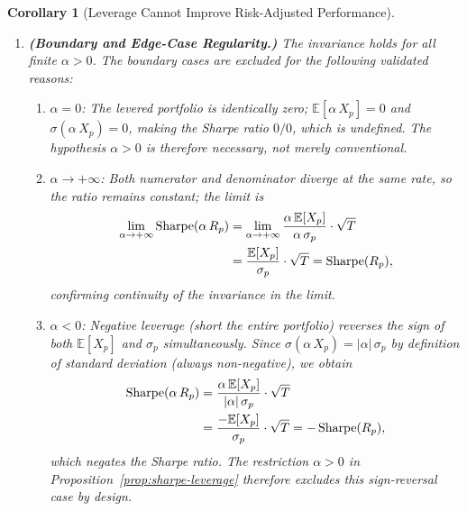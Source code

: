 \documentclass[12pt,openany]{book}
\newcommand{\E}{\mathbb{E}}
\numberwithin{equation}{chapter}
\theoremstyle{plain}
\newtheorem{corollary}[theorem]{Corollary}
\theoremstyle{definition}
\theoremstyle{remark}
\numberwithin{equation}{chapter}
\theoremstyle{plain}
\begin{document}
\begin{corollary}[Leverage Cannot Improve Risk-Adjusted Performance]
\begin{enumerate}
  \item \textbf{(Boundary and Edge-Case Regularity.)}
        The invariance holds for all finite $\alpha > 0$.
        The boundary cases are excluded for the following
        validated reasons:
        \begin{enumerate}
          \item $\alpha = 0$: The levered portfolio is
                identically zero; $\E[\alpha\,X_p] = 0$ and
                $\sigma(\alpha\,X_p) = 0$, making the Sharpe
                ratio $0/0$, which is undefined.  The
                hypothesis $\alpha > 0$ is therefore
                \emph{necessary}, not merely conventional.
          \item $\alpha \to +\infty$: Both numerator and
                denominator diverge at the same rate, so the
                ratio remains constant; the limit is
                \begin{align}
                  \lim_{\alpha\to+\infty}
                  \mathrm{Sharpe}(\alpha\,R_p)
                    &= \lim_{\alpha\to+\infty}
                       \frac{\alpha\,\E[X_p]}
                            {\alpha\,\sigma_p}
                       \cdot\sqrt{T} \notag \\
                    &= \frac{\E[X_p]}{\sigma_p}
                       \cdot\sqrt{T}
                     = \mathrm{Sharpe}(R_p),
                  \label{eq:cor-limit}
                \end{align}
                confirming continuity of the invariance
                in the limit.
          \item $\alpha < 0$: Negative leverage (short the
                entire portfolio) reverses the sign of both
                $\E[X_p]$ and $\sigma_p$ simultaneously.
                Since $\sigma(\alpha\,X_p) = |\alpha|\,\sigma_p$
                by definition of standard deviation (always
                non-negative), we obtain
                \begin{align}
                  \mathrm{Sharpe}(\alpha\,R_p)
                    &= \frac{\alpha\,\E[X_p]}
                            {|\alpha|\,\sigma_p}
                       \cdot\sqrt{T} \notag \\
                    &= \frac{-\E[X_p]}{\sigma_p}
                       \cdot\sqrt{T}
                     = -\,\mathrm{Sharpe}(R_p),
                  \label{eq:cor-neg}
                \end{align}
                which negates the Sharpe ratio.  The
                restriction $\alpha > 0$ in
                Proposition~\ref{prop:sharpe-leverage}
                therefore excludes this sign-reversal case
                by design.
        \end{enumerate}
\end{enumerate}
\end{corollary}
\end{document}
